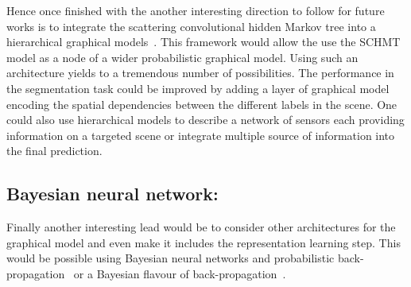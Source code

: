 \documentclass[a4paper,11pt]{report}
\begin{document}
    Hence once finished with the another interesting direction to follow for future works is to integrate the scattering convolutional hidden Markov tree into a hierarchical graphical models~\cite{fine1998hierarchical}. This framework would allow the use the SCHMT model as a node of a wider probabilistic graphical model. Using such an architecture yields to a tremendous number of possibilities. The performance in the segmentation task could be improved by adding a layer of graphical model encoding the spatial dependencies between the different labels in the scene. One could also use hierarchical models to describe a network of sensors each providing information on a targeted scene or integrate multiple source of information into the final prediction.\\
  
  
  \subsection{Bayesian neural network:}
  
    Finally another interesting lead would be to consider other architectures for the graphical model and even make it includes the representation learning step. This would be possible using Bayesian neural networks and probabilistic back-propagation~\cite{hernandez2015probabilistic} or a Bayesian flavour of back-propagation~\cite{blundell2015weight}.
    
\renewcommand\bibname{Bibliography:}

\nocite{*}
\end{document}
